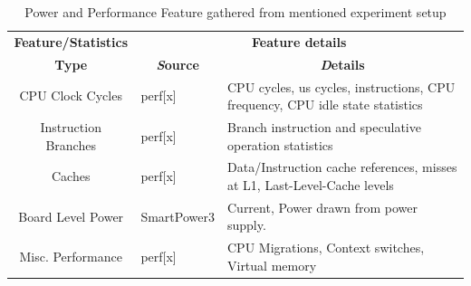 \documentclass[conference]{IEEEtran}
\begin{document}
        \begin{table}[htbp]
            \caption{Power and Performance Feature gathered from mentioned experiment setup}
            \begin{center}
                \begin{tabular}{|c|p{1.8cm}|p{3.9cm}|}
                    \hline
                    \textbf{Feature/Statistics}&\multicolumn{2}{|c|}{\textbf{Feature details }} \\
                    \cline{2-3} 
                    \textbf{Type} & \multicolumn{1}{|c|}{\textbf{\textit Source}} & \multicolumn{1}{|c|}{\textbf{\textit Details}} \\
                    \hline
                    CPU Clock Cycles  & perf[x]  & CPU cycles, us cycles, instructions, CPU frequency, CPU idle state statistics \\
                    \hline
                    Instruction Branches  & perf[x]  & Branch instruction and speculative operation statistics \\
                    \hline
                    Caches   & perf[x]  & Data/Instruction cache references, misses at L1, Last-Level-Cache levels  \\
                    \hline
                    Board Level Power & SmartPower3\cite{odroid-smartpower3} & Current, Power drawn from power supply. \\
                    \hline
                    Misc. Performance  & perf[x]  & CPU Migrations, Context switches, Virtual memory \\
                    \hline
                \end{tabular}
                \label{Power-Perf-data-gathered}
            \end{center}
        \end{table}
\end{document}

